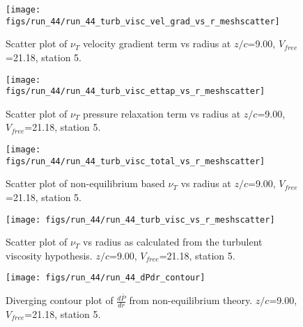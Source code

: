 \begin{figure}[H]
\centering
\texttt{[image: figs/run\_44/run\_44\_turb\_visc\_vel\_grad\_vs\_r\_meshscatter]}
\caption{Scatter plot of $\nu_T$ velocity gradient term vs radius at $z/c$=9.00, $V_{free}$=21.18, station 5.}
\end{figure}


\begin{figure}[H]
\centering
\texttt{[image: figs/run\_44/run\_44\_turb\_visc\_ettap\_vs\_r\_meshscatter]}
\caption{Scatter plot of $\nu_T$ pressure relaxation term vs radius at $z/c$=9.00, $V_{free}$=21.18, station 5.}
\end{figure}


\begin{figure}[H]
\centering
\texttt{[image: figs/run\_44/run\_44\_turb\_visc\_total\_vs\_r\_meshscatter]}
\caption{Scatter plot of non-equilibrium based $\nu_T$ vs radius at $z/c$=9.00, $V_{free}$=21.18, station 5.}
\end{figure}


\begin{figure}[H]
\centering
\texttt{[image: figs/run\_44/run\_44\_turb\_visc\_vs\_r\_meshscatter]}
\caption{Scatter plot of $\nu_T$ vs radius as calculated from the turbulent viscosity hypothesis. $z/c$=9.00, $V_{free}$=21.18, station 5.}
\end{figure}


\begin{figure}[H]
\centering
\texttt{[image: figs/run\_44/run\_44\_dPdr\_contour]}
\caption{Diverging contour plot of $\frac{d\bar{P}}{dr}$ from non-equilibrium theory. $z/c$=9.00, $V_{free}$=21.18, station 5.}
\end{figure}


